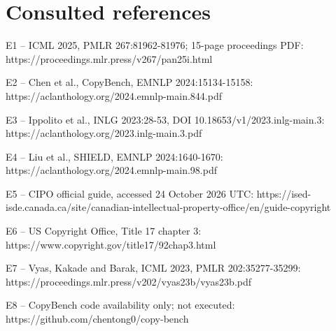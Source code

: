 \documentclass[10pt]{article}
\begin{document}
\section*{Consulted references}
E1 – ICML 2025, PMLR 267:81962-81976; 15-page proceedings PDF: https://proceedings.mlr.press/v267/pan25i.html\par
E2 – Chen et al., CopyBench, EMNLP 2024:15134-15158: https://aclanthology.org/2024.emnlp-main.844.pdf\par
E3 – Ippolito et al., INLG 2023:28-53, DOI 10.18653/v1/2023.inlg-main.3: https://aclanthology.org/2023.inlg-main.3.pdf\par
E4 – Liu et al., SHIELD, EMNLP 2024:1640-1670: https://aclanthology.org/2024.emnlp-main.98.pdf\par
E5 – CIPO official guide, accessed 24 October 2026 UTC: https://ised-isde.canada.ca/site/canadian-intellectual-property-office/en/guide-copyright\par
E6 – US Copyright Office, Title 17 chapter 3: https://www.copyright.gov/title17/92chap3.html\par
E7 – Vyas, Kakade and Barak, ICML 2023, PMLR 202:35277-35299: https://proceedings.mlr.press/v202/vyas23b/vyas23b.pdf\par
E8 – CopyBench code availability only; not executed: https://github.com/chentong0/copy-bench\par
\end{document}
